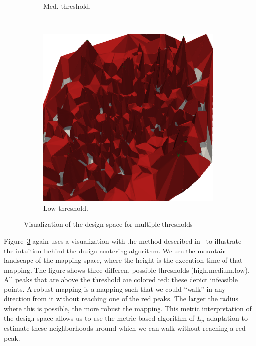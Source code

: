 \begin{figure}[t]
\begin{subfigure}[b]{0.33\textwidth}
		\caption{Med. threshold.}
		\label{fig:lvars-bench-overhead}
	\end{subfigure}
	~
	\begin{subfigure}[b]{0.33\textwidth}
    \includegraphics[width=\textwidth]{figures/coolidge-af-low-threshold.png}
		\caption{Low threshold.}
		\label{fig:lvars-bench-peak}
	\end{subfigure}

	\caption{Visualization of the design space for multiple thresholds}%
	\label{fig:visualization_design_centering_spaces}
\end{figure}

Figure~\ref{fig:visualization_design_centering_spaces} again uses a visualization with the method described in~\cite{visualloss} to illustrate the intuition behind the design centering algorithm.
We see the mountain landscape of the mapping space, where the height is the execution time of that mapping.
The figure shows three different possible thresholds (high,medium,low). All peaks that are above the threshold are colored red: these depict infeasible points.
A robust mapping is a mapping such that we could ``walk'' in any direction from it without reaching one of the red peaks.
The larger the radius where this is possible, the more robust the mapping.
This metric interpretation of the design space allows us to use the metric-based algorithm of $L_p$ adaptation to estimate these neighborhoods around which we can walk without reaching a red peak.


